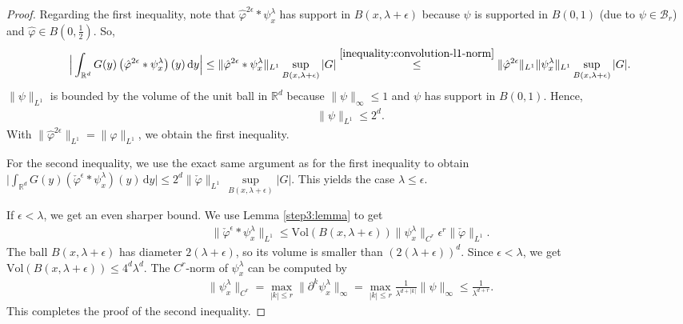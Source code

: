 \begin{proof}
    Regarding the first inequality, note that $\hat \varphi^{2\epsilon} * \psi^\lambda_x$ has support in $B(x, \lambda + \epsilon)$ because $\psi$ is supported in $B(0,1)$ (due to $\psi \in \mathcal{B}_r$) and $\hat \varphi \in B(0, \frac{1}{2})$. So, 
    \begin{align*}
        \Big| \int_{\mathbb{R}^d} G(y) \left( \hat \varphi^{2\epsilon} * \psi^\lambda_x \right) (y) \, \mathrm{d}y \Big| \leq \lVert \hat \varphi^{2\epsilon} * \psi^\lambda_x \rVert_{L^1} \sup_{B(x, \lambda + \epsilon)}|G| \overset{\eqref{inequality:convolution-l1-norm}}{\leq} \lVert \hat \varphi^{2\epsilon} \rVert_{L^1} \lVert \psi^\lambda_x \rVert_{L^1} \sup_{B(x, \lambda + \epsilon)}|G|.
    \end{align*}
    $\lVert \psi \rVert_{L^1}$ is bounded by the volume of the unit ball in $\mathbb{R}^d$ because $\lVert \psi \rVert_{\infty} \leq 1$ and $\psi$ has support in $B(0,1)$. Hence, 
    \begin{align}\label{bound-psi-l1}
        \lVert \psi \rVert_{L^1} \leq 2^d.
    \end{align}
    With $\lVert \hat \varphi^{2\epsilon} \rVert_{L^1} = \lVert \hat \varphi\rVert_{L^1}$, we obtain the first inequality.

    For the second inequality, we use the exact same argument as for the first inequality to obtain $\Big| \int_{\mathbb{R}^d} G(y) \left( \check \varphi^{\epsilon} * \psi^\lambda_x \right) (y) \, \mathrm{d}y \Big| \leq 2^d \lVert \check \varphi \rVert_{L^1} \,  \sup\limits_{B(x, \lambda + \epsilon)}|G|$. This yields the case $\lambda \leq \epsilon$. 
    
    If $\epsilon < \lambda$, we get an even sharper bound. We use Lemma \ref{step3:lemma} to get  
    \begin{align*}
        \lVert \check \varphi^{\epsilon} * \psi^\lambda_x \rVert_{L^1} \leq \mathrm{Vol}(B(x, \lambda + \epsilon)) \lVert \psi^\lambda_x \rVert_{C^r} \epsilon^r \lVert \check \varphi \rVert_{L^1}.
    \end{align*}
    The ball $B(x,\lambda  + \epsilon)$ has diameter $2(\lambda + \epsilon)$, so its volume is smaller than $(2(\lambda + \epsilon))^d$. Since $\epsilon < \lambda$, we get $\mathrm{Vol}(B(x,\lambda  + \epsilon)) \leq 4^d \lambda^d$. The $C^r$-norm of $\psi^\lambda_x$ can be computed by
    \begin{align*}
        \lVert \psi^\lambda_x \rVert_{C^r} = \max_{|k| \leq r} \lVert \partial^k \psi^\lambda_x \rVert_{\infty} =  \max_{|k| \leq r} \frac{1}{\lambda^{d + |k|}} \lVert \psi \rVert_{\infty} \leq \frac{1}{\lambda^{d + r}}.
    \end{align*}    
    This completes the proof of the second inequality.
\end{proof}

